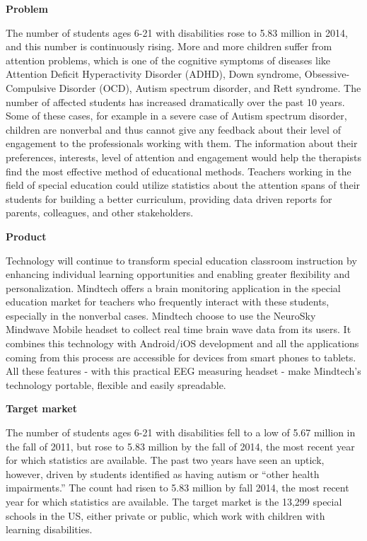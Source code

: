 \documentclass[letterpaper,10pt]{article}
\begin{document}
\begin{onehalfspace}

\large{\bf{Problem}}

The number of students ages 6-21 with disabilities rose to 5.83 million in 2014, and this number is continuously rising. More and more children suffer from attention problems, which is one of the cognitive symptoms of diseases like Attention Deficit Hyperactivity Disorder (ADHD), Down syndrome, Obsessive-Compulsive Disorder (OCD), Autism spectrum disorder, and Rett syndrome. The number of affected students has increased dramatically over the past 10 years. Some of these cases, for example in a severe case of Autism spectrum disorder, children are nonverbal and thus cannot give any feedback about their level of engagement to the professionals working with them. The information about their preferences, interests, level of attention and engagement would help the therapists find the most effective method of educational methods. Teachers working in the field of special education could utilize statistics about the attention spans of their students for building a better curriculum, providing data driven reports for parents, colleagues, and other stakeholders.

\large{\bf{Product}}


Technology will continue to transform special education classroom instruction by enhancing individual learning opportunities and enabling greater flexibility and personalization. Mindtech offers a brain monitoring application in the special education market for teachers who frequently interact with these students, especially in the nonverbal cases.
Mindtech choose to use the NeuroSky Mindwave Mobile headset to collect real time brain wave data from its users. It combines this technology with Android/iOS development and all the applications coming from this process are accessible for devices from smart phones to tablets. All these features - with this practical EEG measuring headset - make Mindtech's technology portable, flexible and easily spreadable.

\large{\bf{Target market}}

The number of students ages 6-21 with disabilities fell to a low of 5.67 million in the fall of 2011, but rose to 5.83 million by the fall of 2014, the most recent year for which statistics are available. The past two years have seen an uptick, however, driven by students identified as having autism or “other health impairments.” The count had risen to 5.83 million by fall 2014, the most recent year for which statistics are available. 
The target market is the 13,299 special schools in the US, either private or public, which work with children with learning disabilities. 


\end{onehalfspace}
\end{document}
